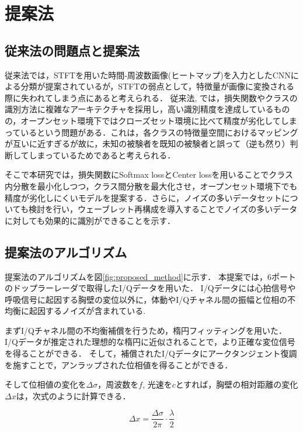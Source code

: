 \chapter{提案法}
\section{従来法の問題点と提案法}
従来法\cite{paper:HeartID}では，STFTを用いた時間-周波数画像(ヒートマップ)を入力としたCNNによる分類が提案されているが，STFTの弱点として，特徴量が画像に変換される際に失われてしまう点にあると考えられる．
従来法\cite{paper:HeartSignature}, \cite{papar:Xing}では，損失関数やクラスの識別方法に複雑なアーキテクチャを採用し，高い識別精度を達成しているものの，オープンセット環境下ではクローズセット環境に比べて精度が劣化してしまっているという問題がある．これは，各クラスの特徴量空間におけるマッピングが互いに近すぎるが故に，未知の被験者を既知の被験者と誤って（逆も然り）判断してしまっているためであると考えられる．

そこで本研究では，損失関数にSoftmax lossとCenter lossを用いることでクラス内分散を最小化しつつ，クラス間分散を最大化させ，オープンセット環境下でも精度が劣化しにくいモデルを提案する．さらに，ノイズの多いデータセットについても検討を行い，ウェーブレット再構成を導入することでノイズの多いデータに対しても効果的に識別ができることを示す．

\section{提案法のアルゴリズム}
提案法のアルゴリズムを図\ref{fig:proposed_method}に示す．
本提案では，6ポートのドップラーレーダで取得したI/Qデータを用いた．
I/Qデータには心拍信号や呼吸信号に起因する胸壁の変位以外に，体動やI/Qチャネル間の振幅と位相の不均衡に起因するノイズが含まれている.

まずI/Qチャネル間の不均衡補償を行うため，楕円フィッティングを用いた．I/Qデータが推定された理想的な楕円に近似されることで，より正確な変位信号を得ることができる\cite{paper:ellipse1}\cite{paper:ellipse2}．
そして，補償されたI/Qデータにアークタンジェント復調を施すことで，アンラップされた位相値を得ることができる．

そして位相値の変化を$\Delta \sigma$，周波数を$f$, 光速を$c$とすれば，胸壁の相対距離の変化$\Delta x$は，次式のように計算できる．

\begin{equation}
	\Delta x = \frac{\Delta \sigma}{2 \pi} \cdot \frac{\lambda}{2}
\end{equation}

